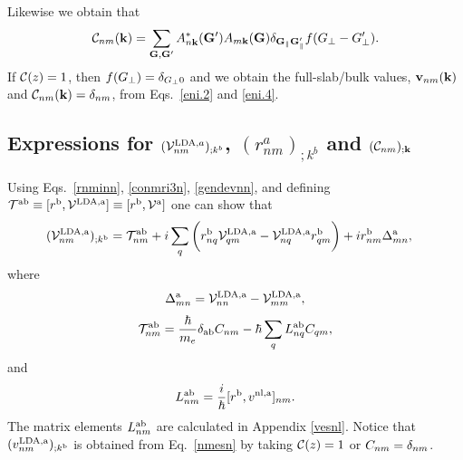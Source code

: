 \documentclass[floatfix,prb,aps,superscriptaddress,11pt,preprint,letterpaper]{revtex4}
\begin{document}
Likewise we obtain that
\begin{align}\label{eni.4}
{\mathbf{\cal C}}_{nm}(\mathbf{k})=
\sum_{\mathbf{G},\mathbf{G}'} A^*_{n\mathbf{k}}(\mathbf{G}')  A_{m\mathbf{k}}(\mathbf{G})
\delta_{\mathbf{G}_\parallel \mathbf{G}'_\parallel} 
f(G_\perp-G'_\perp)
.
\end{align}  
If ${\mathbf{\cal C}}(z)=1$, then $f(G_\perp)=\delta_{G_\perp 0}$ and we 
obtain the full-slab/bulk values, 
$\mathbf{v}_{nm}(\mathbf{k})$ and ${\mathbf{\cal C}}_{nm}(\mathbf{k})=\delta_{nm}$,
from Eqs.~\eqref{eni.2} and \eqref{eni.4}.

\subsection{Expressions for 
\texorpdfstring{$({\mathbf{\cal V}}^{\mathrm{LDA},a}_{nm})_{;k^b}$}{Vnonlocal},
\texorpdfstring{$(r^a_{nm})_{;k^b}$}{Vnonlocal}
and \texorpdfstring{$({\mathbf{\cal C}}_{nm})_{;\mathbf{k}}$}{Vnonlocal}
}\label{appvnl}

Using Eqs.~\eqref{rnminn}, \eqref{conmri3n}, \eqref{gendevnn}, and
defining 
$
{\cal T}^{\mathrm{a}\mathrm{b}}\equiv[r^{\mathrm{b}},{\mathbf{\cal V}}^{\mathrm{LDA},\mathrm{a}}]
\equiv
[r^{\mathrm{b}},{\mathbf{\cal V}}^{\mathrm{a}}]
$
one can show that
\begin{align}\label{nmesn}
({\mathbf{\cal V}}^{\mathrm{LDA},\mathrm{a}}_{nm})_{;k^{\mathrm{b}}}&=
{\cal T}_{nm}^{\mathrm{a}\mathrm{b}}
+i
\sum_{q}
\bigg(
r^{\mathrm{b}}_{nq}  
{\mathbf{\cal V}}^{\mathrm{LDA},\mathrm{a}}_{q m}
-
{\mathbf{\cal V}}^{\mathrm{LDA},\mathrm{a}}_{nq}   
r^{\mathrm{b}}_{q m}
\bigg)  
+i  
r^{\mathrm{b}}_{nm}
\Delta^{\mathrm{a}}_{mn}
,
\end{align}
where
\begin{eqnarray}\label{tdel}
\Delta^{\mathrm{a}}_{mn}
=
{\mathbf{\cal V}}^{\mathrm{LDA},\mathrm{a}}_{nn}  
-
{\mathbf{\cal V}}^{\mathrm{LDA},\mathrm{a}}_{mm}  
,
\end{eqnarray} 
\begin{align}\label{tau.1}
{\cal T}_{nm}^{\mathrm{a}\mathrm{b}}
=
\frac{\hbar}{m_e}\delta_{\mathrm{a}\mathrm{b}} 
C_{nm} 
-\hbar 
\sum_q  
L^{\mathrm{a}\mathrm{b}}_{nq} 
C_{qm} 
,
\end{align}   
and
\begin{align}\label{lab}
L_{nm}^{\mathrm{a}\mathrm{b}}
=\frac{i}{\hbar}[r^{\mathrm{b}},v^{\mathrm{nl},\mathrm{a}}]_{nm}
.
\end{align}  
The matrix elements $L^{\mathrm{a}\mathrm{b}}_{nm}$
are calculated in Appendix \ref{vesnl}.
Notice that
$(v^{\mathrm{LDA},\mathrm{a}}_{nm})_{;k^{\mathrm{b}}}$ is obtained 
from Eq.~\eqref{nmesn} by 
taking 
${\mathbf{\cal C}}(z)=1$ or $C_{nm}=\delta_{nm}$.
\end{document}
